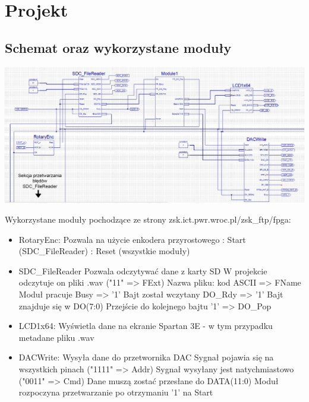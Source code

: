 \documentclass{article}
\begin{document}
\newpage
\section{Projekt}
\subsection{Schemat oraz wykorzystane moduły}
\begin{center}
	\includegraphics[scale=0.5, center]{photo/sch_horizontal.png}
\end{center}
\par Wykorzystane moduły pochodzące ze strony zsk.ict.pwr.wroc.pl/zsk\_ftp/fpga:
\begin{itemize}
	\item{RotaryEnc}: Pozwala na użycie enkodera przyrostowego
		: Start (SDC\_FileReader)
		: Reset (wszystkie moduły)
	\item{SDC\_FileReader} Pozwala odczytywać dane z karty SD
		\subitem W projekcie odczytuje on pliki .wav ("11" => FExt)
		\subitem Nazwa pliku: kod ASCII => FName
		\subitem Moduł pracuje Busy => '1'
		\subitem Bajt został wczytany DO\_Rdy => '1'
			\subsubitem Bajt znajduje się w DO(7:0)
		\subitem Przejście do kolejnego bajtu '1' => DO\_Pop
	\item{LCD1x64}: Wyświetla dane na ekranie Spartan 3E - w tym przypadku metadane pliku .wav
	\item{DACWrite}: Wysyła dane do przetwornika DAC
		\subitem Sygnał pojawia się na wszystkich pinach ("1111" => Addr) \cite{ug230}
		\subitem Sygnał wysyłany jest natychmiastowo ("0011" => Cmd) \cite{ug230}
		\subitem Dane muszą zostać przesłane do DATA(11:0)
			\subsubitem Moduł rozpoczyna przetwarzanie po otrzymaniu '1' na Start
\end{itemize}
\end{document}
